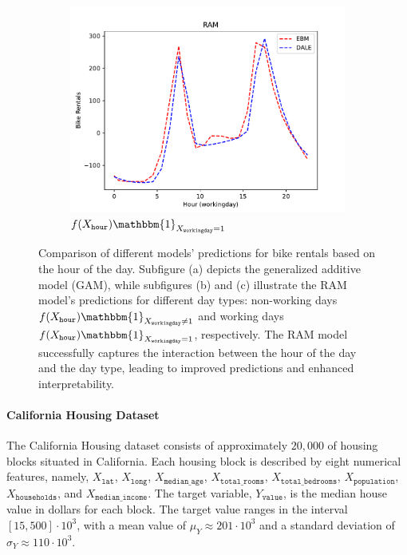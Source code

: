 \documentclass[12pt]{article}
\newcommand{\when}[1]{\mathbbm{1}_{#1}}
\begin{document}
\begin{figure}[htbp]
    \begin{subfigure}{0.32\textwidth}
        \centering
        \includegraphics[width=\textwidth]{figures/bike_rentals_ram_2}
        \caption{\(f(X_{\mathtt{hour}}) \when{X_{\mathtt{workingday}} = 1}\)}
        \label{subfig:bike_rentals_regional_gam_2}
    \end{subfigure}
    \caption{Comparison of different models' predictions for bike rentals based on the hour of the day.
    Subfigure (a) depicts the generalized additive model (GAM),
        while subfigures (b) and (c) illustrate the RAM model's predictions for different day types: non-working days
        \(f(X_{\mathtt{hour}}) \when{X_{\mathtt{workingday}} \neq 1}\) and
        working days \(f(X_{\mathtt{hour}}) \when{X_{\mathtt{workingday}} = 1}\), respectively.
        The RAM model successfully captures the interaction between the hour of the day and the day type,
        leading to improved predictions and enhanced interpretability.}
    \label{fig:bike_sharing}
\end{figure}

\paragraph{California Housing Dataset}


The California Housing dataset consists of approximately $20,000$ of housing blocks situated in California.
Each housing block is described by eight numerical features, namely,
$X_{\mathtt{lat}}$, $X_{\mathtt{long}}$, $X_{\mathtt{median\_age}}$, $X_{\mathtt{total\_rooms}}$, $X_{\mathtt{total\_bedrooms}}$, $X_{\mathtt{population}}$, $X_{\mathtt{households}}$, and $X_{\mathtt{median\_income}}$.
The target variable, $Y_{\mathtt{value}}$, is the median house value in dollars for each block.
The target value ranges in the interval \([15, 500] \cdot 10^3\), with a mean value of
\(\mu_Y \approx 201 \cdot 10^3 \) and a standard deviation of \(\sigma_Y \approx 110 \cdot 10^3\).
\end{document}
